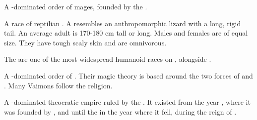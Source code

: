 \documentclass
  [a4paper,
   12pt,
   oneside
  ]%
  {article}
\begin{document}
\begin{gloss}
\begin{comment}
\paragraph{\rethyax}
\end{comment}
\gitem[\rethyaxes]{\rethyax}
A -dominated order of mages, founded by the . 



\begin{comment}
\paragraph{\scatha}
\end{comment}
\gitem[\scathae]{\scatha}
A race of reptilian . 
A \scatha{} resembles an anthropomorphic lizard with a long, rigid tail. 
An average adult is 170-180 cm tall or long. 
Males and females are of equal size. 
They have tough scaly skin and are omnivorous. 

The \scathae{} are one of the most widespread humanoid races on \Miith{}, alongside . 



\begin{comment}
\paragraph{Vaimon}
\end{comment}
A -dominated order of .
Their magic theory is based around the two forces of  and . 
Many Vaimons follow the  religion.



\begin{comment}
\paragraph{\VaimonCaliphate}
\end{comment}
\gitem{\VaimonCaliphate}
\index{\VaimonCaliphate}
A \human-dominated theocratic empire ruled by the . 
It existed from the year , where it was founded by , and until the  in the year 	 where it fell, during the reign of . 




\end{gloss}
\end{document}
